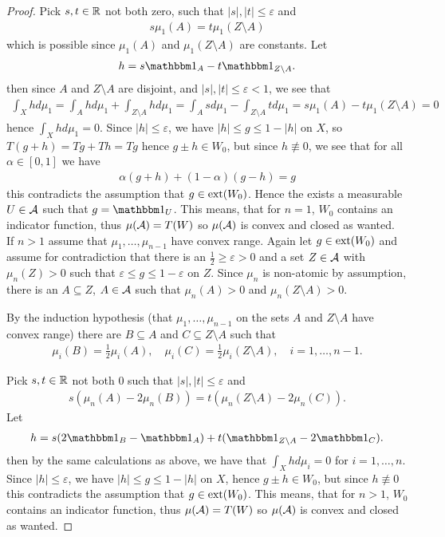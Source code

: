 \documentclass[../../main.tex]{subfiles}
\begin{document}
\begin{proof}
Pick $s,t\in \mathbb{R}$ not both zero, such that $|s|,|t| \le \varepsilon$ and
\begin{align*}
	s\mu_{1}(A) = t\mu_{1}(Z\setminus A)
\end{align*}
which is possible since $\mu_{1}(A)$ and $\mu_{1}(Z\setminus A)$ are constants. Let
\begin{align*}
	h=s\ind{A} - t\ind{Z\setminus A}.
\end{align*}
then since $A$ and $Z\setminus A$ are disjoint, and $|s|,|t|\le \varepsilon < 1$, we see that
\begin{align*}
	\int_{X}hd\mu_{1}=\int_{A}hd\mu_{1} + \int_{Z\setminus A}hd\mu_{1}=\int_{A}sd\mu_{1}-\int_{Z\setminus A}td\mu_{1}=s\mu_{1}(A) - t\mu_{1}(Z\setminus A)=0
\end{align*}
hence $\int_{X} h d\mu_{1}=0$. Since $|h|\le \varepsilon$, we have $|h|\le g \le 1-|h|$ on $X$, so $T(g+h)=Tg+Th=Tg$ hence $g\pm h \in W_{0}$, but since $h\not\equiv 0$, we see that for all $\alpha\in [0,1]$ we have
\begin{align*}
	\alpha(g+h)+ (1-\alpha)(g-h)=g
\end{align*}
this contradicts the assumption that $g\in \operatorname{ext}(W_{0})$. Hence the exists a measurable $U\in \mathcal{A}$ such that $g=\ind{U}$. This means, that for $n=1$, $W_{0}$ contains an indicator function, thus $\mu(\mathcal{A})=T(W)$ so $\mu(\mathcal{A})$ is convex and closed as wanted. \\

If $n > 1$ assume that $\mu_{1}, \dots, \mu_{n-1}$ have convex range. Again let $g\in \operatorname{ext}(W_{0})$ and assume for contradiction that there is an $\frac{1}{2} \ge \varepsilon > 0$ and a set $Z\in \mathcal{A}$ with $\mu_{n}(Z)>0$ such that $\varepsilon \le g \le 1-\varepsilon$ on $Z$. Since $\mu_{n}$ is non-atomic by assumption, there is an $A\subseteq Z$, $A\in \mathcal{A}$ such that $\mu_{n}(A)>0$ and $\mu_{n}(Z\setminus A)>0$.

By the induction hypothesis (that $\mu_{1}, \dots, \mu_{n-1}$ on the sets $A$ and $Z\setminus A$ have convex range) there are $B\subseteq A$ and $C\subseteq Z\setminus A$ such that
\begin{align*}
	\mu_{i}(B)=\frac{1}{2}\mu_{i}(A), \quad \mu_{i}(C)=\frac{1}{2}\mu_{i}(Z\setminus A), \quad i=1, \dots, n-1.
\end{align*}

Pick $s,t\in \mathbb{R}$ not both $0$ such that $|s|,|t|\le \varepsilon$ and
\begin{align*}
	s(\mu_{n}(A) - 2\mu_{n}(B)) = t(\mu_{n}(Z\setminus A) - 2\mu_{n}(C)).
\end{align*}
Let
\begin{align*}
	h=s(2\ind{B}-\ind{A}) + t(\ind{Z\setminus A} - 2\ind{C}).
\end{align*}
then by the same calculations as above, we have that $\int_{X} h d\mu_{i}=0$ for $i=1, \dots, n$. Since $|h|\le \varepsilon$, we have $|h|\le g \le 1-|h|$ on $X$, hence $g\pm h \in W_{0}$, but since $h\not\equiv 0$ this contradicts the assumption that $g\in \operatorname{ext}(W_{0})$. This means, that for $n > 1$, $W_{0}$ contains an indicator function, thus $\mu(\mathcal{A})=T(W)$ so $\mu(\mathcal{A})$ is convex and closed as wanted.


\end{proof}
\end{document}
